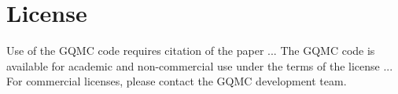 \section{License}
Use of the GQMC code requires citation of the paper ...
The GQMC code is available for academic and non-commercial use under the terms of the license ...
For commercial licenses, please contact the GQMC development team. 